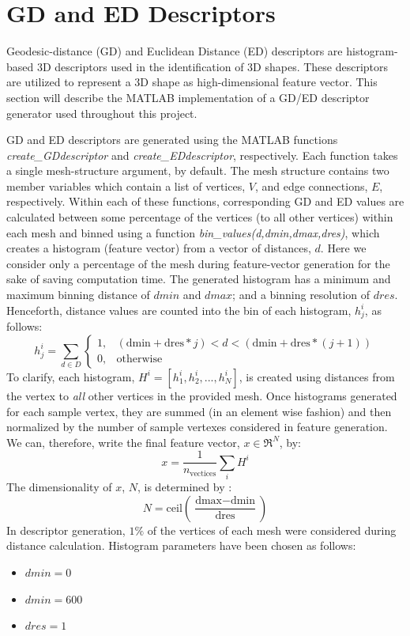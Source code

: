 \documentclass[12pt]{article}
\begin{document}
\section*{GD and ED Descriptors}
	
	\noindent
	Geodesic-distance (GD) and Euclidean Distance (ED) descriptors are histogram-based 3D descriptors used in the identification of 3D shapes. These descriptors are utilized to represent a 3D shape as high-dimensional feature vector. This section will describe the MATLAB implementation of a GD/ED descriptor generator used throughout this project.

	\noindent
	 GD and ED descriptors are generated using the MATLAB functions \emph{create\_GDdescriptor} and \emph{create\_EDdescriptor}, respectively. Each function takes a single mesh-structure argument, by default. The mesh structure contains two member variables which contain a list of vertices, $V$, and edge connections, $E$, respectively. Within each of these functions, corresponding GD and ED values are calculated between some percentage of the vertices (to all other vertices) within each mesh and binned using a function  \emph{bin\_values(d,dmin,dmax,dres)}, which creates a histogram (feature vector) from a vector of distances, $d$. Here we consider only a percentage of the mesh during feature-vector generation for the sake of saving computation time. The generated histogram has a minimum and maximum binning distance of $dmin$ and $dmax$; and a binning resolution of $dres$. Henceforth, distance values are counted into the \jth bin of each \ith histogram, $h_{j}^{i}$, as follows:
	\begin{equation}
    		h_{j}^{i} = 
		\sum_{d \in D}  
		\begin{cases}
    		1,	& (\text{dmin} + \text{dres}*j) < d < (\text{dmin} + \text{dres}*(j+1))  \\
    		0,   & \text{otherwise}
		\end{cases}
	\end{equation}
	To clarify, each histogram,  $H^{i} = [h_{1}^{i},h_{2}^{i},...,h_{N}^{i}]$, is created using distances from the \ith vertex to \emph{all} other vertices in the provided mesh. Once histograms generated for each sample vertex, they are summed (in an element wise fashion) and then normalized by the number of sample vertexes considered in feature generation. We can, therefore, write the final feature vector, $x\in\Re^{N}$, by:
	\begin{equation}
		x = \frac{1}{n_{\text{vectices}}}\sum_{i} H^{i}
	\end{equation}
	The dimensionality of $x$, $N$, is determined by :
	\begin{equation}
		N = \text{ceil}\left( \frac{\text{dmax} - \text{dmin} }{\text{dres}} \right)
	\end{equation}
	\noindent
	In descriptor generation, $1\%$ of the vertices of each mesh were considered during distance calculation. Histogram parameters have been chosen as follows:
	\begin{itemize}
	\item{$dmin = 0$}
	\item{$dmin = 600$}
	\item{$dres = 1$}
	\end{itemize}
\end{document}

